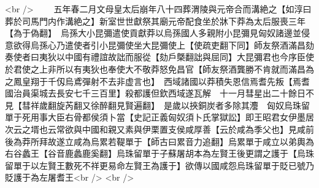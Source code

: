 <br />
　　五年春二月文母皇太后崩年八十四葬渭陵與元帝合而溝絶之【如淳曰葬於司馬門内作溝絶之】新室世世獻祭其廟元帝配食坐於牀下莽為太后服喪三年【為于偽翻】　烏孫大小昆彌遣使貢獻莽以烏孫國人多親附小昆彌見匈奴諸邊並侵意欲得烏孫心乃遣使者引小昆彌使坐大昆彌使上【使疏吏翻下同】師友祭酒滿昌劾奏使者曰夷狄以中國有禮誼故詘而服從【劾戶槩翻詘與屈同】大昆彌君也今序臣使於君使之上非所以有夷狄也奉使大不敬莽怒免昌官【師友祭酒龔勝不肯就而滿昌為之鳳皇翔于千仭烏鳶彈射不去非虚言也】　西域諸國以莽積失恩信焉耆先叛【焉耆國治員渠城去長安七千三百里】殺都護但欽西域遂瓦解　十一月彗星出二十餘日不見【彗祥歲翻旋芮翻又徐醉翻見賢遍翻】　是歲以挾銅炭者多除其灋　匈奴烏珠留單于死用事大臣右骨都侯須卜當【史記正義匈奴須卜氏掌獄訟】即王昭君女伊墨居次云之壻也云常欲與中國和親又素與伊栗置支侯咸厚善【云於咸為季父也】見咸前後為莽所拜故遂立咸為烏累若鞮單于【師古曰累音力追翻】烏累單于咸立以弟輿為右谷蠡王【谷音鹿蠡鹿奚翻】烏珠留單于子蘇屠胡本為左賢王後更謂之護于【烏珠留單于以左賢王數死不祥更易命左賢王為護于】欲傳以國咸怨烏珠留單于貶已號乃貶護于為左屠耆王<br />
<br />
